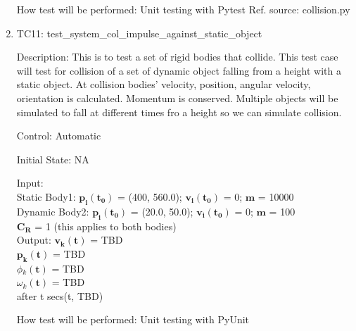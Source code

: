 \documentclass[12pt, titlepage]{article}
\begin{document}
\begin{enumerate}
	How test will be performed: Unit testing with Pytest
	Ref. source: collision.py
	
	\item{TC11: test\_system\_col\_impulse\_against\_static\_object\\}

Description: This is to test a set of rigid bodies that collide. This test case will test for collision of a set of dynamic object falling from a height with a static object. At collision bodies' velocity, position, angular velocity, orientation is calculated. Momentum is conserved. Multiple objects will be simulated to fall at different times fro a height so we can simulate collision.

Control: Automatic

Initial State: NA

Input:\\
Static Body1: $\mathbf{p_i}$$\mathbf{(t_0)}$ = (400, 560.0); $\mathbf{v_i}$$\mathbf{(t_0)}$ = 0; $\mathbf{m}$ = 10000 \\ 
Dynamic Body2: $\mathbf{p_i}$$\mathbf{(t_0)}$ = (20.0, 50.0); $\mathbf{v_i}$$\mathbf{(t_0)}$ = 0; $\mathbf{m}$ = 100 \\ 
$\mathbf{C_R}$$\mathbf{}$ = 1 (this applies to both bodies) \\


Output:  $\mathbf{v_k}$$\mathbf{(t)}$ = TBD \\
\hspace*{1.3cm}$\mathbf{p_k}$$\mathbf{(t)}$ = TBD\\
\hspace*{1.3cm}$\phi$$_k\mathbf{(t)}$ = TBD\\
\hspace*{1.3cm}$\omega$$_k\mathbf{(t)}$$ \mathbf{}$ = TBD\\
after t secs(t, TBD) 

How test will be performed: Unit testing with PyUnit

\end{enumerate}	
	
\end{document}
